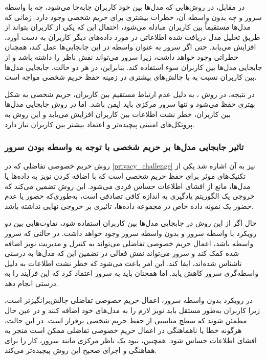 در مقابل، در روش‌هایی که مدل‌ها بین خود کاربران جابه‌جا می‌شود، چه با واسطه سرور و چه بدون واسطه آن، خطرات بیشتری برای حریم شخصی وجود دارد. زمانی که مدل‌ها مستقیماً بین کاربران مبادله می‌شود، احتمال این که یکی از کاربران بتواند از طریق تحلیل مدل دریافت ‌شده اطلاعاتی در مورد داده‌های دیگر کاربران به دست آورد، افزایش می‌یابد. حتی اگر سرور به عنوان واسطه در این جابجایی‌ها عمل کند، همچنان خطراتی وجود خواهد داشت، زیرا سرور می‌تواند نقش ناظر را داشته باشد و از جابجایی مدل‌ها بین کاربران سوء استفاده کند. بنابراین، در هر دو حالت، جابجایی مدل‌ها بین کاربران نسبت به
با چالش‌های بیشتری در زمینه حفظ حریم شخصی مواجه است.

در نتیجه، در روش
%
، به دلیل عدم ارتباط مستقیم بین کاربران، حریم شخصی به شکل بهتری حفظ می‌شود و تنها سرور مرکزی باید ایمن باشد. اما در روش جابجایی مدل‌ها بین کاربران، خطر نشت اطلاعات بین کاربران افزایش می‌یابد و این روش به پروتکل‌های امنیتی پیچیده‌تر و اعتماد بیشتر بین کاربران نیاز دارد.


\subsubsection{
	تاثیر جابجایی مدل‌ها بر حریم شخصی با توجه به واسطه بودن سرور
}
روش حریم خصوصی تفاضلی که در
\ref{privacy_challenge}
نیز به آن اشاره شد یکی از تکنیک‌های موثر برای حفظ حریم شخصی است که با اضافه کردن نویز به داده‌ها یا مدل‌ها، مانع از افشای اطلاعات حساس فردی می‌شود. این روش تضمین می‌کند که خروجی یک الگوریتم یادگیری به اندازه کافی تصادفی است، به‌طوری‌که حضور یا عدم حضور یک نمونه داده خاص در مجموعه داده‌ها، تاثیری بر خروجی نهایی نداشته باشد.

حال اگر از این روش در جابجایی مدل‌ها بین کاربران استفاده شود، تفاوت‌هایی بین دو رویکرد با واسطه سرور و بدون واسطه سرور وجود خواهد داشت. در حالتی که سرور واسطه باشد، اعمال حریم خصوصی تفاضلی می‌تواند به کنترل و مدیریت نویز اضافه شده کمک کند و سرور می‌تواند نقش فعالی در تضمین این که مدل‌ها به درستی ناشناس‌ شده‌اند، ایفا کند. این امر باعث می‌شود که خطر نشت اطلاعات به دلیل واسطه‌گری سرور کاهش یابد. اما همچنان باید به سرور اعتماد کرد که این فرآیند را به درستی انجام دهد.

در رویکرد بدون واسطه سرور، اعمال حریم خصوصی تفاضلی چالش‌برانگیزتر است، زیرا کاربران به‌طور مستقل باید نویز لازم را به مدل‌های خود اضافه کنند و در عین حال مطمئن شوند که سطح مناسبی از حفظ حریم شخصی برقرار است. در این حالت، هرگونه خطا یا ناهماهنگی در اعمال حریم خصوصی تفاضلی ممکن است منجر به افشای اطلاعات حساس شود. همچنین، نبود یک ناظر مرکزی مانند سرور، کار را برای هماهنگی و اجرای صحیح این روش پیچیده‌تر می‌کند.

